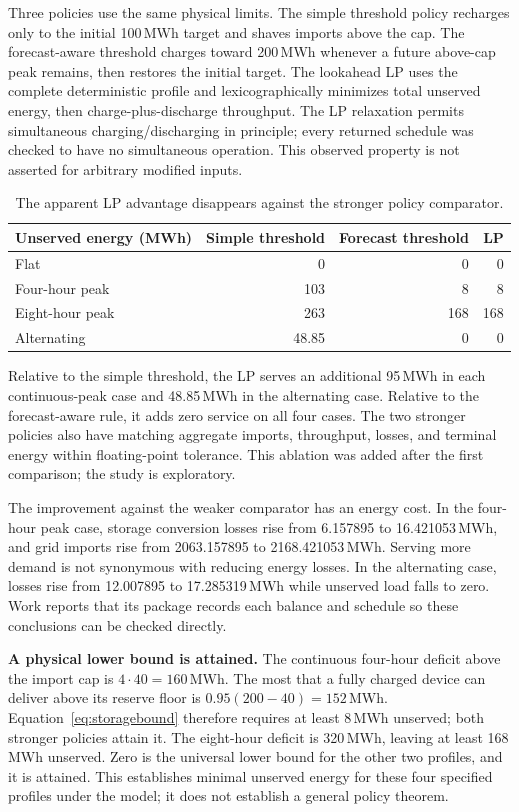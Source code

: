 \documentclass[11pt,letterpaper]{article}
\begin{document}
Three policies use the same physical limits. The simple threshold policy recharges only to the initial 100\,MWh target and shaves imports above the cap. The forecast-aware threshold charges toward 200\,MWh whenever a future above-cap peak remains, then restores the initial target. The lookahead LP uses the complete deterministic profile and lexicographically minimizes total unserved energy, then charge-plus-discharge throughput. The LP relaxation permits simultaneous charging/discharging in principle; every returned schedule was checked to have no simultaneous operation. This observed property is not asserted for arbitrary modified inputs.

\begin{table}[ht]
\centering\begin{tabular}{lrrr}
\toprule Unserved energy (MWh) & Simple threshold & Forecast threshold & LP\\\midrule
Flat &0&0&0\\
Four-hour peak &103&8&8\\
Eight-hour peak &263&168&168\\
Alternating &48.85&0&0\\\bottomrule
\end{tabular}
\caption{The apparent LP advantage disappears against the stronger policy comparator.}
\label{tab:bess}
\end{table}

Relative to the simple threshold, the LP serves an additional 95\,MWh in each continuous-peak case and 48.85\,MWh in the alternating case. Relative to the forecast-aware rule, it adds zero service on all four cases. The two stronger policies also have matching aggregate imports, throughput, losses, and terminal energy within floating-point tolerance. This ablation was added after the first comparison; the study is exploratory.

The improvement against the weaker comparator has an energy cost. In the four-hour peak case, storage conversion losses rise from 6.157895 to 16.421053\,MWh, and grid imports rise from 2063.157895 to 2168.421053\,MWh. Serving more demand is not synonymous with reducing energy losses. In the alternating case, losses rise from 12.007895 to 17.285319\,MWh while unserved load falls to zero. Work reports that its package records each balance and schedule so these conclusions can be checked directly.

\textbf{A physical lower bound is attained.} The continuous four-hour deficit above the import cap is $4\cdot40=160$\,MWh. The most that a fully charged device can deliver above its reserve floor is $0.95(200-40)=152$\,MWh. Equation~\eqref{eq:storagebound} therefore requires at least 8\,MWh unserved; both stronger policies attain it. The eight-hour deficit is 320\,MWh, leaving at least 168\,MWh unserved. Zero is the universal lower bound for the other two profiles, and it is attained. This establishes minimal unserved energy for these four specified profiles under the model; it does not establish a general policy theorem.
\end{document}
